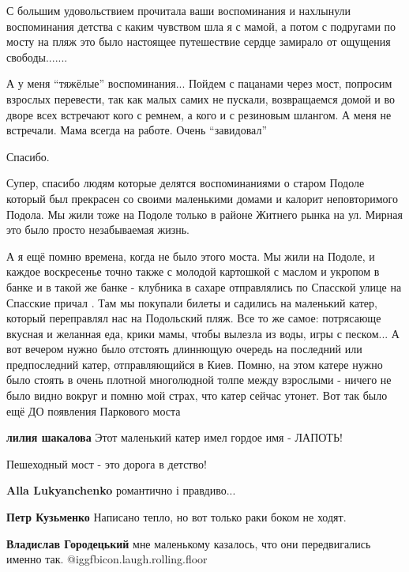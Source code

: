 \begin{itemize}
С большим удовольствием прочитала ваши воспоминания и нахлынули воспоминания
детства с каким чувством шла я с мамой, а потом с подругами по мосту на пляж это
было настоящее путешествие сердце замирало от ощущения свободы.......


А у меня \enquote{тяжёлые} воспоминания... Пойдем с пацанами через мост, попросим
взрослых перевести, так как малых самих не пускали, возвращаемся домой и во
дворе всех встречают кого с ремнем, а кого и с резиновым шлангом. А меня не
встречали. Мама всегда на работе. Очень \enquote{завидовал}


Спасибо.


Супер, спасибо людям которые делятся воспоминаниями о старом Подоле который был
прекрасен со своими маленькими домами и калорит неповторимого Подола. Мы жили
тоже на Подоле только в районе Житнего рынка на ул. Мирная это было просто
незабываемая жизнь.


А я ещё помню времена, когда не было этого моста. Мы жили на Подоле, и каждое
воскресенье точно также с молодой картошкой с маслом и укропом в банке и в
такой же банке - клубника в сахаре отправлялись по Спасской улице на Спасские
причал . Там мы покупали билеты и садились на маленький катер, который
переправлял нас на Подольский пляж. Все то же самое: потрясающе вкусная и
желанная еда, крики мамы, чтобы вылезла из воды, игры с песком... А вот вечером
нужно было отстоять длиннющую очередь на последний или предпоследний катер,
отправляющийся в Киев. Помню, на этом катере нужно было стоять в очень плотной
многолюдной толпе между взрослыми - ничего не было видно вокруг и помню мой
страх, что катер сейчас утонет. Вот так было ещё ДО появления Паркового моста


\textbf{лилия шакалова} Этот маленький катер имел гордое имя - ЛАПОТЬ!

Пешеходный мост - это дорога в детство!

\textbf{Alla Lukyanchenko} романтично і правдиво...

\textbf{Петр Кузьменко}
Написано тепло, но вот только раки боком не ходят.

\begin{itemize} %
\textbf{Владислав Городецький} мне маленькому казалось, что они передвигались именно так. @igg{fbicon.laugh.rolling.floor} 


\end{itemize}
\end{itemize}

